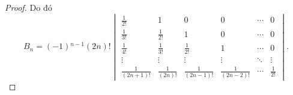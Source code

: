 \begin{proof}
    Do đó
    \[
        B_{n} = (-1){}^{n-1}(2n)!
        \begin{vmatrix}
            \frac{1}{2!}      & 1               & 0                 & 0                 & \cdots & 0            \\
            \frac{1}{3!}      & \frac{1}{2!}    & 1                 & 0                 & \cdots & 0            \\
            \frac{1}{4!}      & \frac{1}{3!}    & \frac{1}{2!}      & 1                 & \cdots & 0            \\
            \vdots            & \vdots          & \vdots            & \vdots            & \ddots & \vdots       \\
            \frac{1}{(2n+1)!} & \frac{1}{(2n)!} & \frac{1}{(2n-1)!} & \frac{1}{(2n-2)!} & \cdots & \frac{1}{2!}
        \end{vmatrix}.
    \]


\end{proof}
